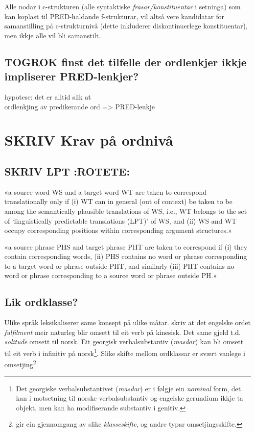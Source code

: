 \documentclass[11pt,a4paper,oneside,draft]{book}
\begin{document}
Alle nodar i c-strukturen (alle syntaktiske \emph{frasar/konstituentar} i
setninga) som kan koplast til PRED-haldande f-strukturar, vil altså
vere kandidatar for samanstilling på c-strukturnivå (dette inkluderer
diskontinuerlege konstituentar), men ikkje alle vil bli samanstilt.
\subsection{\textbf{TOGROK} finst det tilfelle der ordlenkjer ikkje impliserer PRED-lenkjer?}
\label{sec-3.4.1}

   hypotese: det er alltid slik at \\
   ordlenkjing av predikerande ord => PRED-lenkje
\section{\textbf{SKRIV} Krav på ordnivå}
\label{sec-3.5}

\label{SEC:ordkrav}
\subsection{\textbf{SKRIV} LPT \textbf{:ROTETE:}}
\label{sec-3.5.1}

«a source word WS and a target word WT are taken to correspond
translationally only if (i) WT can in general (out of context) be
taken to be among the semantically plausible translations of WS, i.e.,
WT belongs to the set of `linguistically predictable translations
(LPT)' of WS, and (ii) WS and WT occupy corresponding positions within
corresponding argument structures.»

«a source phrase PHS and target phrase PHT are taken to correspond if
(i) they contain corresponding words, (ii) PHS contains no word or
phrase corresponding to a target word or phrase outside PHT, and
similarly (iii) PHT contains no word or phrase corresponding to a
source word or phrase outside PH.»


\subsection{Lik ordklasse?}
\label{sec-3.5.2}

Ulike språk leksikaliserer same konsept på ulike
måtar. \citet[s.~3]{cheung2002scg} skriv at det engelske ordet
\emph{fulfilment} meir naturleg blir omsett til eit verb på kinesisk. Det
same gjeld t.d. \emph{solitude} omsett til norsk. Eit georgisk
verbalsubstantiv (\emph{masdar}) kan bli omsett til eit verb i infinitiv på
norsk\footnote{Det georgiske verbalsubstantivet (\emph{masdar}) er i følgje
        \citet[kap.~2.5]{aronson1990grg} ein \emph{nominal} form, det kan i
        motsetning til norske verbalsubstantiv og engelske gerundium
        ikkje ta objekt, men kan ha modifiserande substantiv i
        genitiv. }. Slike skifte mellom ordklassar er svært vanlege i
omsetjing\footnote{\citet[Catford~(1965),~i][s.~61]{munday2001its} gir ein gjennomgang av
slike \emph{klasseskifte}, og andre typar omsetjingsskifte. }.
\end{document}
